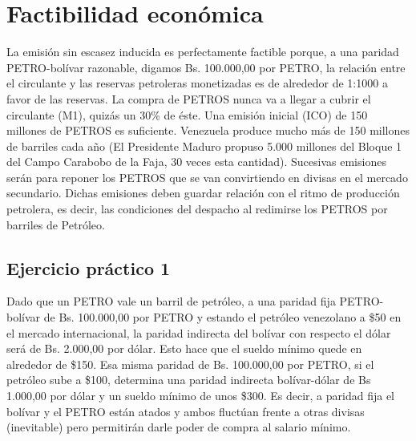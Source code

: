 %
\section{Factibilidad económica}
\label{sec:fact}
%
La emisión sin escasez inducida es perfectamente factible porque, a una paridad PETRO-bolívar razonable, digamos Bs. 100.000,00 por PETRO, la relación entre el circulante y las reservas petroleras monetizadas es de alrededor de 1:1000 a favor de las reservas. La compra de PETROS nunca va a llegar a cubrir el circulante (M1), quizás un 30\% de éste. Una emisión inicial (ICO) de 150 millones de PETROS es suficiente. Venezuela produce mucho más de 150 millones de barriles cada año (El Presidente Maduro propuso 5.000 millones del Bloque 1 del Campo Carabobo de la Faja, 30 veces esta cantidad). Sucesivas emisiones serán para reponer los PETROS que se van convirtiendo en divisas en el mercado secundario. Dichas emisiones deben guardar relación con el ritmo de producción petrolera, es decir, las condiciones del despacho al redimirse los PETROS por barriles de Petróleo.
%
\subsection{Ejercicio práctico 1}
%
Dado que un PETRO vale un barril de petróleo, a una paridad fija PETRO-bolívar de Bs. 100.000,00 por PETRO y estando el petróleo venezolano a \$50 en el mercado internacional, la paridad indirecta del bolívar con respecto el dólar será de Bs. 2.000,00 por dólar. Esto hace que el sueldo mínimo quede en alrededor de \$150. Esa misma paridad de Bs. 100.000,00 por PETRO, si el petróleo sube a \$100, determina una paridad indirecta bolívar-dólar de Bs 1.000,00 por dólar y un sueldo mínimo de unos \$300. Es decir, a paridad fija el bolívar y el PETRO están atados y ambos fluctúan frente a otras divisas (inevitable) pero permitirán darle poder de compra al salario mínimo.
